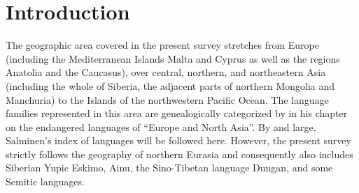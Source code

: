 
\chapter{Introduction}
The geographic area covered in the present survey stretches from Europe (including the Mediterranean Islands Malta and Cyprus as well as the regions Anatolia and the Caucasus), over central, northern, and northeastern Asia (including the whole of Siberia, the adjacent parts of northern Mongolia and Manchuria) to the Islands of the northwestern Pacific Ocean. The language families represented in this area are genealogically categorized by \cite{salminen2007} in his chapter on the endangered languages of “Europe and North Asia”. By and large, Salminen's index of languages will be followed here. However, the present survey strictly follows the geography of northern Eurasia and consequently also includes Siberian Yupic Eskimo, Ainu, the Sino-Tibetan language Dungan, and some Semitic languages.

